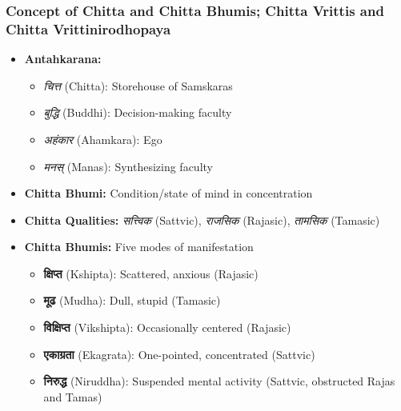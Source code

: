 		
\begin{frame}[fragile]\frametitle{Concept of Chitta and Chitta Bhumis; Chitta Vrittis and Chitta Vrittinirodhopaya}

    \begin{itemize}
        \item \textbf{Antahkarana:} 
        \begin{itemize}
            \item \textit{चित्त} (Chitta): Storehouse of Samskaras
            \item \textit{बुद्धि} (Buddhi): Decision-making faculty
            \item \textit{अहंकार} (Ahamkara): Ego
            \item \textit{मनस्} (Manas): Synthesizing faculty
        \end{itemize}
        \item \textbf{Chitta Bhumi:} Condition/state of mind in concentration
        \item \textbf{Chitta Qualities:} \textit{सत्त्विक} (Sattvic), \textit{राजसिक} (Rajasic), \textit{तामसिक} (Tamasic)
        \item \textbf{Chitta Bhumis:} Five modes of manifestation
        \begin{itemize}
            \item \textbf{क्षिप्त} (Kshipta): Scattered, anxious (Rajasic)
            \item \textbf{मूढ} (Mudha): Dull, stupid (Tamasic)
            \item \textbf{विक्षिप्त} (Vikshipta): Occasionally centered (Rajasic)
            \item \textbf{एकाग्रता} (Ekagrata): One-pointed, concentrated (Sattvic)
            \item \textbf{निरुद्ध} (Niruddha): Suspended mental activity (Sattvic, obstructed Rajas and Tamas)
        \end{itemize}
    \end{itemize}

\end{frame}

